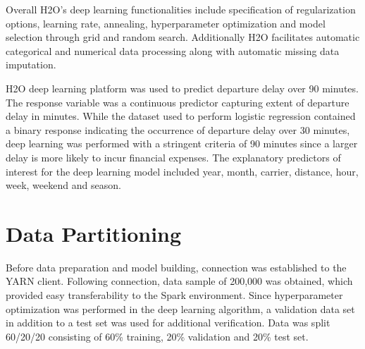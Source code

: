 \documentclass[12pt,twoside]{amherstthesis}
\begin{document}
  Overall H2O's deep learning functionalities include specification of
  regularization options, learning rate, annealing, hyperparameter
  optimization and model selection through grid and random search.
  Additionally H2O facilitates automatic categorical and numerical data
  processing along with automatic missing data imputation.
  
  H2O deep learning platform was used to predict departure delay over 90
  minutes. The response variable was a continuous predictor capturing
  extent of departure delay in minutes. While the dataset used to perform
  logistic regression contained a binary response indicating the
  occurrence of departure delay over 30 minutes, deep learning was
  performed with a stringent criteria of 90 minutes since a larger delay
  is more likely to incur financial expenses. The explanatory predictors
  of interest for the deep learning model included year, month, carrier,
  distance, hour, week, weekend and season.
  
  \clearpage 
  
  \section{Data Partitioning}\label{data-partitioning-2}
  
  Before data preparation and model building, connection was established
  to the YARN client. Following connection, data sample of 200,000 was
  obtained, which provided easy transferability to the Spark environment.
  Since hyperparameter optimization was performed in the deep learning
  algorithm, a validation data set in addition to a test set was used for
  additional verification. Data was split 60/20/20 consisting of 60\%
  training, 20\% validation and 20\% test set.
  
  \begin{Shaded}
  \end{Shaded}
  
\end{document}
